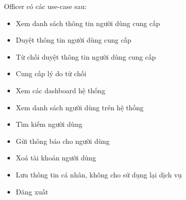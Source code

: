 \documentclass[../main.tex]{subfiles}
\begin{document}
	Officer có các use-case sau:

	\begin{itemize}
		\item Xem danh sách thông tin người dùng cung cấp
		\item Duyệt thông tin người dùng cung cấp
		\item Từ chối duyệt thông tin người dùng cung cấp
		\item Cung cấp lý do từ chối
		\item Xem các dashboard hệ thống
		\item Xem danh sách người dùng trên hệ thống
		\item Tìm kiếm người dùng
		\item Gửi thông báo cho người dùng
		\item Xoá tài khoản người dùng
		\item Lưu thông tin cá nhân, không cho sử dụng lại dịch vụ
		\item Đăng xuất
	\end{itemize}

	\newpage
\end{document}
